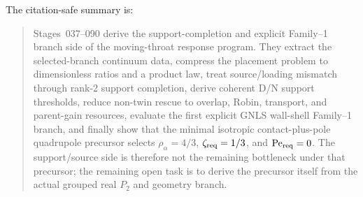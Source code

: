 The citation-safe summary is:
\begin{quote}
Stages~037--090 derive the support-completion and explicit Family--1 branch side of the moving-throat response program.  They extract the selected-branch continuum data, compress the placement problem to dimensionless ratios and a product law, treat source/loading mismatch through rank-2 support completion, derive coherent D/N support thresholds, reduce non-twin rescue to overlap, Robin, transport, and parent-gain resources, evaluate the first explicit GNLS wall-shell Family--1 branch, and finally show that the minimal isotropic contact-plus-pole quadrupole precursor selects \(\rho_\alpha=4/3\), \(\zeta_{\rm req}=1/3\), and \(\mathrm{Pe}_{\rm req}=0\).  The support/source side is therefore not the remaining bottleneck under that precursor; the remaining open task is to derive the precursor itself from the actual grouped real \(P_2\) and geometry branch.
\end{quote}
